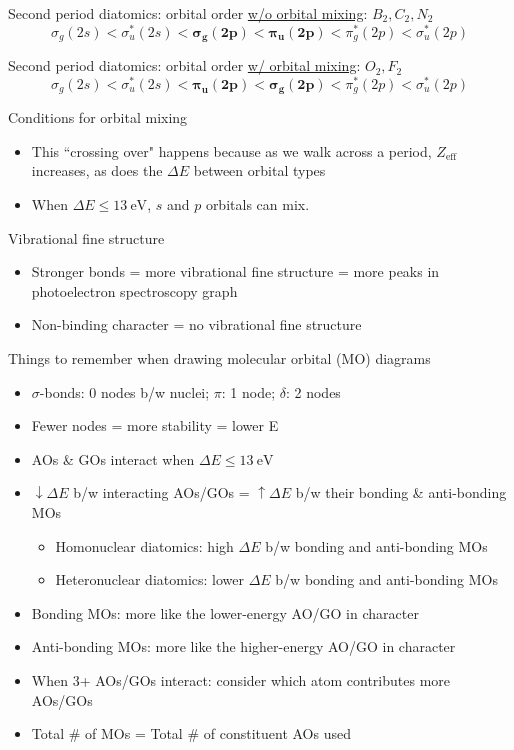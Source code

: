\documentclass[10pt,landscape]{article}
\begin{document}
\begin{multicols}{3}
Second period diatomics: orbital order \underline{w/o orbital mixing}: $B_2, C_2, N_2$
\[ \sigma_g(2s) < \sigma_u^*(2s) < \mathbf{\sigma_g(2p) < \pi_u(2p)} < \pi_g^*(2p) < \sigma_u^*(2p) \]

Second period diatomics: orbital order \underline{w/ orbital mixing}: $O_2, F_2$
\[ \sigma_g(2s) < \sigma_u^*(2s) < \mathbf{\pi_u(2p) < \sigma_g(2p)} < \pi_g^*(2p) < \sigma_u^*(2p) \]

Conditions for orbital mixing
\begin{itemize}
	\item This ``crossing over" happens because as we walk across a period, $Z_\text{eff}$ increases, as does the $\Delta E$ between orbital types
	\item When $\Delta E \leq \SI{13}{\electronvolt}$, $s$ and $p$ orbitals can mix.
\end{itemize}

Vibrational fine structure
\begin{itemize}
	\item Stronger bonds = more vibrational fine structure = more peaks in photoelectron spectroscopy graph
	\item Non-binding character = no vibrational fine structure
\end{itemize}


Things to remember when drawing molecular orbital (MO) diagrams
\begin{itemize}
	\item $\sigma$-bonds: 0 nodes b/w nuclei; $\pi$: 1 node; $\delta$: 2 nodes 
	\item Fewer nodes = more stability = lower E
	\item AOs \& GOs interact when $\Delta E \leq \SI{13}{\electronvolt}$
	\item $\downarrow \Delta E$ b/w interacting AOs/GOs = $\uparrow \Delta E$ b/w their bonding \& anti-bonding MOs
	\begin{itemize}
			\item Homonuclear diatomics: high $\Delta E$ b/w bonding and anti-bonding MOs
			\item Heteronuclear diatomics: lower $\Delta E$ b/w bonding and anti-bonding MOs
	\end{itemize}
	\item Bonding MOs: more like the lower-energy AO/GO in character
	\item Anti-bonding MOs: more like the higher-energy AO/GO in character
	\item When 3+ AOs/GOs interact: consider which atom contributes more AOs/GOs
	\item Total \# of MOs = Total \# of constituent AOs used
\end{itemize}


\end{multicols}
\end{document}
